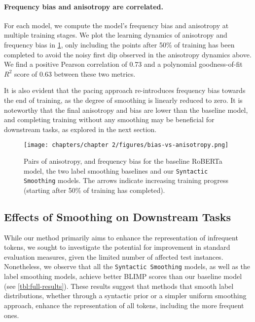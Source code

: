 \paragraph{Frequency bias and anisotropy are correlated.}

For each model, we compute the model's frequency bias and anisotropy at multiple training stages. We plot the learning dynamics of anisotropy and frequency bias in \cref{fig:bias-anisotropy-correlation}, only including the points after 50\% of training has been completed to avoid the noisy first dip observed in the anisotropy dynamics above. We find a positive Pearson correlation of 0.73 and a polynomial goodness-of-fit $R^2$ score of 0.63 between these two metrics.

It is also evident that the pacing approach re-introduces frequency bias towards the end of training, as the degree of smoothing is linearly reduced to zero. It is noteworthy that the final anisotropy and bias are lower than the baseline model, and completing training without any smoothing may be beneficial for downstream tasks, as explored in the next section.

\begin{figure}[h]
    \centering
    \texttt{[image: chapters/chapter 2/figures/bias-vs-anisotropy.png]}
    \caption{Pairs of anisotropy, and frequency bias for the baseline RoBERTa model, the two label smoothing baselines and our \texttt{Syntactic Smoothing} models. The arrows indicate increasing training progress (starting after 50\% of training has completed).}
    \label{fig:bias-anisotropy-correlation}
\end{figure}

\subsection{Effects of Smoothing on Downstream Tasks}
While our method primarily aims to enhance the representation of infrequent tokens, we sought to investigate the potential for improvement in standard evaluation measures, given the limited number of affected test instances. Nonetheless, we observe that all the \texttt{Syntactic Smoothing} models, as well as the label smoothing models, achieve better BLIMP scores than our baseline model (see \cref{tbl:full-results}). These results suggest that methods that smooth label distributions, whether through a syntactic prior or a simpler uniform smoothing approach, enhance the representation of all tokens, including the more frequent ones.

